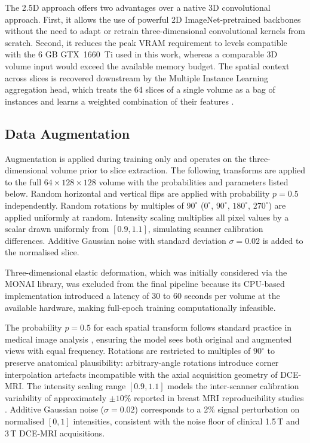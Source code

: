 The 2.5D approach offers two advantages over a native 3D
convolutional approach.
First, it allows the use of powerful 2D ImageNet-pretrained
backbones without the need to adapt or retrain
three-dimensional convolutional kernels from scratch.
Second, it reduces the peak VRAM requirement to levels
compatible with the 6 GB GTX~1660~Ti used in this work,
whereas a comparable 3D volume input would exceed the
available memory budget.
The spatial context across slices is recovered downstream
by the Multiple Instance Learning aggregation head, which
treats the 64 slices of a single volume as a bag of
instances and learns a weighted combination of their
features \cite{ilse2018attention}.


\subsection{Data Augmentation}
\label{sec:augmentation}

Augmentation is applied during training only and operates
on the three-dimensional volume prior to slice extraction.
The following transforms are applied to the full
$64 \times 128 \times 128$ volume with the probabilities
and parameters listed below.
Random horizontal and vertical flips are applied with
probability $p=0.5$ independently.
Random rotations by multiples of $90^\circ$
($0^\circ$, $90^\circ$, $180^\circ$, $270^\circ$) are applied
uniformly at random.
Intensity scaling multiplies all pixel values by a scalar
drawn uniformly from $[0.9, 1.1]$, simulating scanner
calibration differences.
Additive Gaussian noise with standard deviation
$\sigma=0.02$ is added to the normalised slice.

Three-dimensional elastic deformation, which was initially
considered via the MONAI library, was excluded from the final
pipeline because its CPU-based implementation introduced a
latency of 30 to 60 seconds per volume at the available
hardware, making full-epoch training computationally
infeasible.

The probability $p = 0.5$ for each spatial transform
follows standard practice in medical image analysis
\cite{litjens2017survey}, ensuring the model sees
both original and augmented views with equal frequency.
Rotations are restricted to multiples of $90^\circ$
to preserve anatomical plausibility: arbitrary-angle
rotations introduce corner interpolation artefacts
incompatible with the axial acquisition geometry of
DCE-MRI.
The intensity scaling range $[0.9, 1.1]$ models the
inter-scanner calibration variability of approximately
$\pm 10\%$ reported in breast MRI reproducibility
studies \cite{lavdas2019}.
Additive Gaussian noise ($\sigma = 0.02$) corresponds
to a 2\% signal perturbation on normalised $[0,1]$
intensities, consistent with the noise floor of
clinical 1.5\,T and 3\,T DCE-MRI acquisitions.


